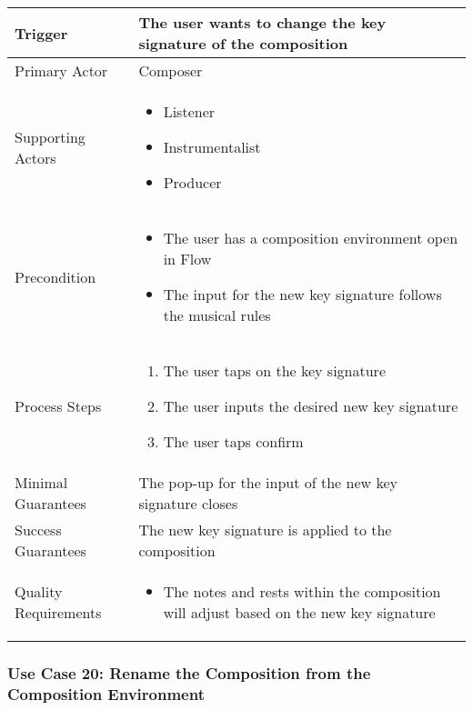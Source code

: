 \begin{tabularx}{\textwidth}{|X|X|}
\hline
Trigger & 
The user wants to change the key signature of the composition \\
\hline
Primary Actor & 
Composer \\
\hline
Supporting Actors & 
\begin{itemize}
\item Listener
\item Instrumentalist
\item Producer
\end{itemize} \\
\hline
Precondition & 
\begin{itemize}
\item The user has a composition environment open in Flow
\item The input for the new key signature follows the musical rules
\end{itemize} \\
\hline
Process Steps & 
\begin{enumerate}
\item The user taps on the key signature
\item The user inputs the desired new key signature
\item The user taps confirm
\end{enumerate} \\
\hline
Minimal Guarantees & 
The pop-up for the input of the new key signature closes \\
\hline
Success Guarantees & 
The new key signature is applied to the composition \\
\hline
Quality Requirements & 
\begin{itemize}
\item The notes and rests within the composition will adjust based on the new key signature
\end{itemize} \\ 
\hline
\end{tabularx}

\subsubsection{Use Case 20: Rename the Composition from the Composition Environment}

